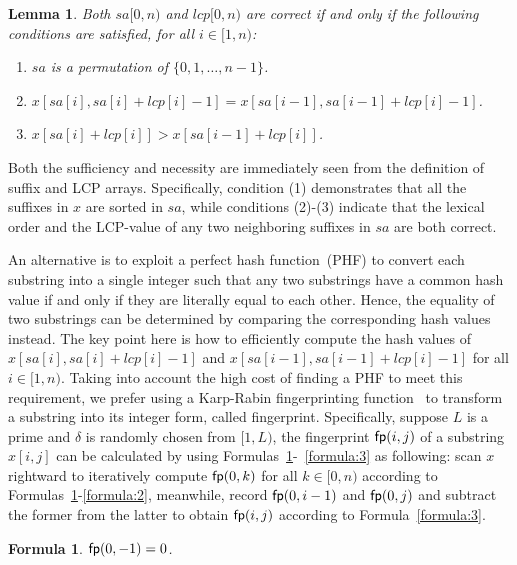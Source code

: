 \documentclass[10pt,journal,compsoc]{IEEEtran}
\newtheorem{Formula}{Formula}
\newtheorem{Lemma}{Lemma}
\begin{document}
\begin{Lemma} \label{lemma:1}
	Both $sa[0, n)$ and $lcp[0, n)$ are correct if and only if the following conditions are satisfied, for all $i \in [1, n)$:
	\begin{enumerate}[(1)]
		\item
		$sa$ is a permutation of $\{0, 1, \dots, n - 1\}$.
		\item
		$x[sa[i], sa[i] + lcp[i] - 1] = x[sa[i - 1], sa[i - 1] + lcp[i] - 1]$.
		\item
		$x[sa[i] + lcp[i]] > x[sa[i - 1] + lcp[i]]$. 	
	\end{enumerate}
\end{Lemma}

\begin{IEEEproof}
	Both the sufficiency and necessity are immediately seen from the definition of suffix and LCP arrays. Specifically, condition (1) demonstrates that all the suffixes in $x$ are sorted in $sa$, while conditions (2)-(3) indicate that the lexical order and the LCP-value of any two neighboring suffixes in $sa$ are both correct.
\end{IEEEproof}

An alternative is to exploit a perfect hash function~(PHF) to convert each substring into a single integer such that any two substrings have a common hash value if and only if they are literally equal to each other. Hence, the equality of two substrings can be determined by comparing the corresponding hash values instead. The key point here is how to efficiently compute the hash values of $x[sa[i], sa[i] + lcp[i] - 1]$ and $x[sa[i - 1], sa[i - 1] + lcp[i] - 1]$ for all $i \in [1, n)$. Taking into account the high cost of finding a PHF to meet this requirement, we prefer using a Karp-Rabin fingerprinting function~\cite{Karp1987} to transform a substring into its integer form, called fingerprint. Specifically, suppose $L$ is a prime and $\delta$ is randomly chosen from $[1, L)$, the fingerprint ${\sf fp}(i, j)$ of a substring $x[i, j]$ can be calculated by using Formulas~\ref{formula:1}-~\ref{formula:3} as following: scan $x$ rightward to iteratively compute ${\sf fp}(0, k)$ for all $k \in [0, n)$ according to Formulas~\ref{formula:1}-\ref{formula:2}, meanwhile, record ${\sf fp}(0, i - 1)$ and ${\sf fp}(0, j)$ and subtract the former from the latter to obtain ${\sf fp}(i, j)$ according to Formula~\ref{formula:3}.

\begin{Formula} \label{formula:1}
	${\sf fp}(0, -1) = 0$.
	
\end{Formula}
\end{document}
